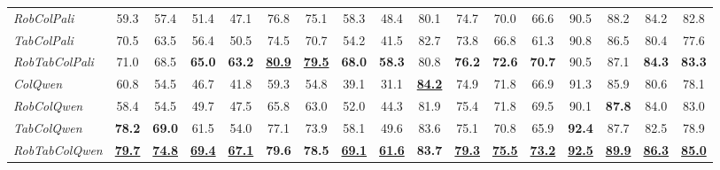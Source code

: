 \begin{table*}[th]
\begin{tabular*}{1.03\linewidth}{@{\extracolsep{\fill}}l|cccc|cccc|cccc|cccc}
\hspace{0.3cm}\textit{RobColPali} & 
59.3 & 57.4 & 51.4 & 47.1 & 
76.8 & 75.1 & 58.3 & 48.4 & 
80.1 & 74.7 & 70.0 & 66.6 & 
90.5 & 88.2 & 84.2 & 82.8 \\

\hspace{0.3cm}\textit{TabColPali} & 
70.5 & 63.5 & 56.4 & 50.5 & 
74.5 & 70.7 & 54.2 & 41.5 & 
82.7 & 73.8 & 66.8 & 61.3 & 
90.8 & 86.5 & 80.4 & 77.6 \\

\hspace{0.3cm}\textit{RobTabColPali} & 
71.0 & 68.5 & \textbf{65.0} & \textbf{63.2} & 
\underline{\textbf{80.9}} & \underline{\textbf{79.5}} & \textbf{68.0} & \textbf{58.3} & 
80.8 & \textbf{76.2} & \textbf{72.6} & \textbf{70.7} & 
90.5 & 87.1 & \textbf{84.3} & \textbf{83.3} \\
\addlinespace
\textit{ColQwen} & 
60.8 & 54.5 & 46.7 & 41.8 & 
59.3 & 54.8 & 39.1 & 31.1 & 
\underline{\textbf{84.2}} & 74.9 & 71.8 & 66.9 & 
91.3 & 85.9 & 80.6 & 78.1 \\

\hspace{0.3cm}\textit{RobColQwen} & 
58.4 & 54.5 & 49.7 & 47.5 & 
65.8 & 63.0 & 52.0 & 44.3 & 
81.9 & 75.4 & 71.8 & 69.5 & 
90.1 & \textbf{87.8} & 84.0 & 83.0 \\

\hspace{0.3cm}\textit{TabColQwen} & 
\textbf{78.2} & \textbf{69.0} & 61.5 & 54.0 & 
77.1 & 73.9 & 58.1 & 49.6 & 
83.6 & 75.1 & 70.8 & 65.9 & 
\textbf{92.4} & 87.7 & 82.5 & 78.9 \\

\hspace{0.3cm}\textit{RobTabColQwen} & 
\textbf{\underline{79.7}} & \textbf{\underline{74.8}} & \textbf{\underline{69.4}} & \textbf{\underline{67.1}} & 
\textbf{79.6} & \textbf{78.5} & \textbf{\underline{69.1}} & \textbf{\underline{61.6}} & 
\textbf{83.7} & \textbf{\underline{79.3}} & \textbf{\underline{75.5}} & \textbf{\underline{73.2}} & 
\textbf{\underline{92.5}} & \textbf{\underline{89.9}} & \textbf{\underline{86.3}} & \textbf{\underline{85.0}} \\

\bottomrule
\end{tabular*}
\label{Table:rephrasing_benchmarks}
\end{table*}


